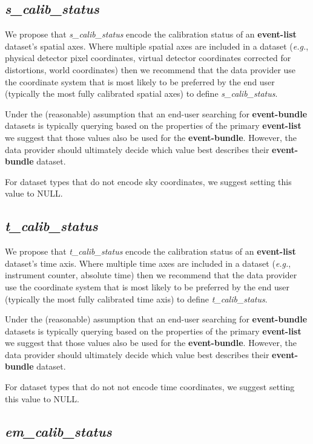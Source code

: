 \documentclass[11pt,a4paper]{ivoa}
\begin{document}
\subsection{{\em s\_calib\_status}}

We propose that {\em s\_calib\_status} encode the calibration status of an {\bf event-list} dataset's spatial axes.  Where multiple spatial axes are included in a dataset ({\em e.g.\/}, physical detector pixel coordinates, virtual detector coordinates corrected for distortions, world coordinates) then we recommend that the data provider use the coordinate system that is most likely to be preferred by the end user (typically the most fully calibrated spatial axes) to define {\em s\_calib\_status\/}.

Under the (reasonable) assumption that an end-user searching for {\bf event-bundle} datasets is typically querying based on the properties of the primary {\bf event-list} we suggest that those values also be used for the {\bf event-bundle}.  However, the data provider should ultimately decide which value best describes their {\bf event-bundle} dataset.

For dataset types that do not encode sky coordinates, we suggest setting this value to NULL\null.

\subsection{{\em t\_calib\_status}}

We propose that {\em t\_calib\_status}  encode the calibration status of an {\bf event-list} dataset's time axis.  Where multiple time axes are included in a dataset ({\em e.g.\/}, instrument counter, absolute time) then we recommend that the data provider use the coordinate system that is most likely to be preferred by the end user (typically the most fully calibrated time axis) to define {\em t\_calib\_status\/}.

Under the (reasonable) assumption that an end-user searching for {\bf event-bundle} datasets is typically querying based on the properties of the primary {\bf event-list} we suggest that those values also be used for the {\bf event-bundle}.  However, the data provider should ultimately decide which value best describes their {\bf event-bundle} dataset.

For dataset types that do not not encode time coordinates, we suggest setting this value to NULL\null.

\subsection{{\em em\_calib\_status}}
\end{document}
